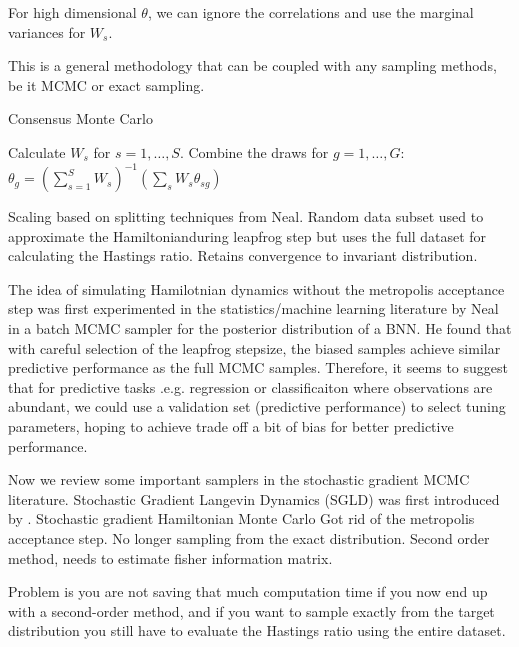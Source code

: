 \documentclass{book}
\begin{document}
\begin{enumerate}
For high dimensional $\theta$, we can ignore the correlations and use the
marginal variances for $W_s$.

This is a general methodology that can be coupled with any sampling methods, be
it MCMC or exact sampling. 
\begin{algorithm}
    \caption{Consensus Monte Carlo}
    \State Calculate $W_s$ for $s=1,\dots,S$.
    \State Combine the draws for $g=1,\dots,G$:$ \theta_g = (\sum_{s=1}^S
    W_s)^{-1}(\sum_s W_s \theta_{sg})$
\end{algorithm}

Scaling based on splitting techniques from Neal. Random data subset used to approximate the Hamiltonianduring leapfrog step but uses the full dataset for calculating the Hastings ratio. Retains convergence to invariant distribution. 


The idea of simulating Hamilotnian dynamics without the metropolis acceptance step was first experimented in the statistics/machine learning literature by Neal \cite{neal1993bayesian} in a batch MCMC sampler for the posterior distribution of a BNN. He found that with careful selection of the leapfrog stepsize, the biased samples achieve similar predictive performance as the full MCMC samples. Therefore, it seems to suggest that for predictive tasks .e.g. regression or classificaiton where observations are abundant, we could 
use a validation set (predictive performance) to select tuning parameters, hoping to achieve trade off a bit of bias for better predictive performance. 

Now we review some important samplers in the stochastic gradient MCMC
literature. Stochastic Gradient Langevin Dynamics (SGLD) was first introduced by
\cite{welling2011bayesian}. 
Stochastic gradient Hamiltonian Monte Carlo
Got rid of the metropolis acceptance step. No longer sampling from the exact
distribution. Second order method, needs to estimate fisher information matrix.

\cite{chen2014stochastic}

Problem is you are not saving that much computation time if you now end up with a second-order method, and if you want to sample exactly from the target distribution you still have to evaluate the Hastings ratio using the entire dataset.


\end{enumerate}
\end{document}
